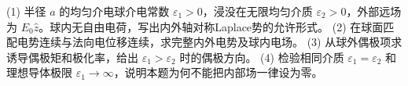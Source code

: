 (1) 半径 \(a\) 的均匀介电球介电常数 \(\varepsilon_1>0\)，浸没在无限均匀介质 \(\varepsilon_2>0\)，外部远场为 \(E_0\hat z\)。球内无自由电荷，写出内外轴对称Laplace势的允许形式。
(2) 在球面匹配电势连续与法向电位移连续，求完整内外电势及球内电场。
(3) 从球外偶极项求诱导偶极矩和极化率，给出 \(\varepsilon_1>\varepsilon_2\) 时的偶极方向。
(4) 检验相同介质 \(\varepsilon_1=\varepsilon_2\) 和理想导体极限 \(\varepsilon_1\to\infty\)，说明本题为何不能把内部场一律设为零。

